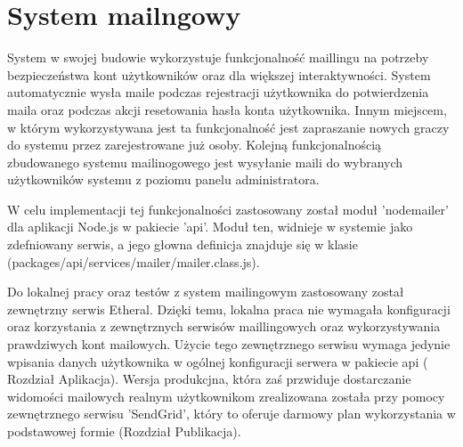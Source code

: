 \section{System mailngowy}
System w swojej budowie wykorzystuje funkcjonalność maillingu na potrzeby bezpieczeństwa kont użytkowników oraz dla większej interaktywności. System automatycznie wysła maile podczas rejestracji użytkownika do potwierdzenia maila oraz podczas akcji resetowania hasła konta użytkownika. Innym miejscem, w którym wykorzystywana jest ta funkcjonalność jest zapraszanie nowych graczy do systemu przez zarejestrowane już osoby. Kolejną funkcjonalnością zbudowanego systemu mailinogowego jest wysyłanie maili do wybranych użytkowników systemu z poziomu panelu administratora.

W celu implementacji tej funkcjonalności zastosowany został moduł 'nodemailer' dla aplikacji Node.js w pakiecie 'api'. Moduł ten, widnieje w systemie jako zdefniowany serwis, a jego głowna definicja znajduje się w klasie (packages/api/services/mailer/mailer.class.js).

Do lokalnej pracy oraz testów z system mailingowym zastosowany został zewnętrzny serwis Etheral. Dzięki temu, lokalna praca nie wymagała konfiguracji oraz korzystania z zewnętrznych serwisów maillingowych oraz wykorzystywania prawdziwych kont mailowych. Użycie tego zewnętrznego serwisu wymaga jedynie wpisania danych użytkownika w ogólnej konfiguracji serwera w pakiecie api ( Rozdział Aplikacja). Wersja produkcjna, która zaś przwiduje dostarczanie widomości mailowych realnym użytkownikom zrealizowana została przy pomocy zewnętrznego serwisu 'SendGrid', który to oferuje darmowy plan wykorzystania w podstawowej formie (Rozdział Publikacja).
